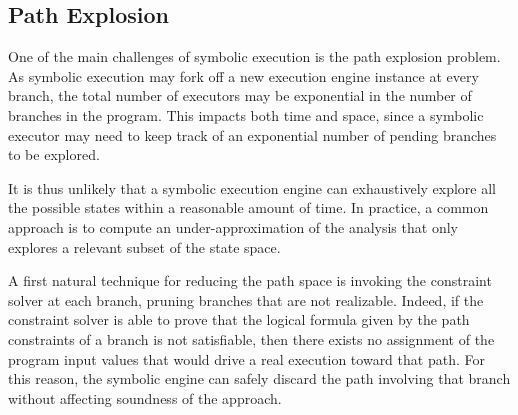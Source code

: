 
\subsection{Path Explosion}
\label{ss:path-explosion}


One of the main challenges of symbolic execution is the path explosion problem. As symbolic execution may fork off a new execution engine instance at every branch, the total number of executors may be exponential in the number of branches in the program. This impacts both time and space, since a symbolic executor may need to keep track of an exponential number of pending branches to be explored.

It is thus unlikely that a symbolic execution engine can exhaustively explore all the possible states within a reasonable amount of time. In practice, a common approach is to compute an under-approximation of the analysis that only explores a relevant subset of the state space.


A first natural technique for reducing the path space is invoking the constraint solver at each branch, pruning branches that are not realizable. Indeed, if the constraint solver is able to prove that the logical formula given by the path constraints of a branch is not satisfiable, then there exists no assignment of the program input values that would drive a real execution toward that path. For this reason, the symbolic engine can safely discard the path involving that branch without affecting soundness of the approach. 

